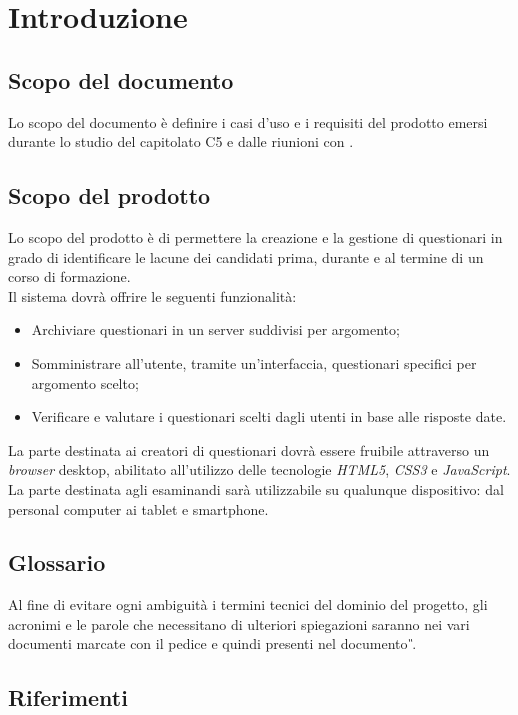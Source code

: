 \newpage
\section{Introduzione}

\subsection{Scopo del documento}
Lo scopo del documento è definire i casi d'uso e i requisiti del prodotto emersi durante lo studio del capitolato C5 e dalle riunioni con \ZU.
\subsection{Scopo del prodotto}
Lo scopo del prodotto è di permettere la creazione e la gestione di questionari in grado di identificare le lacune dei candidati prima, durante e al termine di un corso di formazione. 
\\Il sistema dovrà offrire le seguenti funzionalità:
\begin{itemize}
\item
Archiviare questionari in un server suddivisi per argomento;
\item
Somministrare all'utente, tramite un'interfaccia, questionari specifici per argomento scelto;
\item
Verificare e valutare i questionari scelti dagli utenti in base alle risposte date.
\end{itemize}
La parte destinata ai creatori di questionari dovrà essere fruibile attraverso un \textit{browser} desktop, abilitato all'utilizzo delle tecnologie \textit{HTML5}, \textit{CSS3} e \textit{JavaScript}. La parte destinata agli esaminandi sarà utilizzabile su qualunque dispositivo: dal personal computer ai tablet e smartphone.

\subsection{Glossario}
Al fine di evitare ogni ambiguità i termini tecnici del dominio del progetto, gli acronimi e le parole che necessitano di ulteriori spiegazioni saranno nei vari documenti marcate con il pedice  e quindi presenti nel documento \textit{\G}.

\subsection{Riferimenti}

